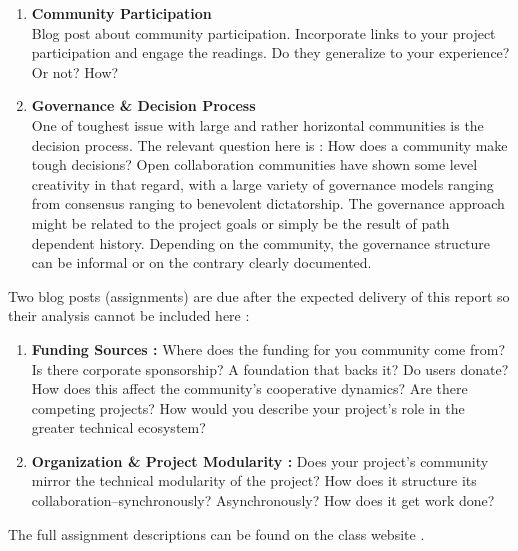 \begin{enumerate}
  \item {\bf Community Participation} \\
Blog post about community participation. Incorporate links to your project participation and engage the readings. Do they generalize to your experience? Or not? How? \\

  \item {\bf Governance \& Decision Process}\\
  One of toughest issue with large and rather horizontal communities is the decision process. The relevant question here is : How does a community make tough decisions? Open collaboration communities have shown some level creativity in that regard, with a large variety of governance models ranging from consensus ranging to benevolent dictatorship. The governance approach might be related to the project goals or simply be the result of path dependent history. Depending on the community, the governance structure can be informal or on the contrary clearly documented.

\end{enumerate}


\noindent Two blog posts (assignments) are due after the expected delivery of this report so their analysis cannot be included here :

\begin{enumerate}[resume]
\item {\bf Funding Sources :} Where does the funding for you community come from? Is there corporate sponsorship? A foundation that backs it? Do users donate? How does this affect the community's cooperative dynamics? Are there competing projects? How would you describe your project's role in the greater technical ecosystem?

\item{\bf Organization \& Project Modularity :} Does your project's community mirror the technical modularity of the project? How does it structure its collaboration--synchronously? Asynchronously? How does it get work done?

\end{enumerate}

\noindent The full assignment descriptions can be found on the class website \cite{classweb2013}.



